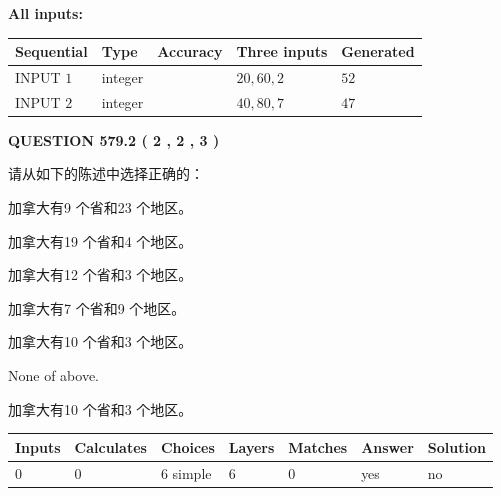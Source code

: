 \documentclass{ctexart}
\begin{document}
   
   
   
\noindent\vspace{0.1in}\hspace{-0.08in} {\textbf{\Large{All inputs: }}}
   
   
  
  
\noindent\begin{tabular}{|l|l|l|l|l|}
\hline
 Sequential & Type & Accuracy & Three inputs & Generated \\ 
\hline
 
 
  INPUT $  1 $ & integer &  & $
 20
 , 
 60
 , 
 2
 $ & $ 52 $ 
 \\  \hline  
 
 
  INPUT $  2 $ & integer &  & $
 40
 , 
 80
 , 
 7
 $ & $ 47 $ 
 \\  \hline  
 \end{tabular}
   
   
  
\vspace{0.2in}
  
{\textbf{\Large{QUESTION
579.2 
 ( 2 , 2 , 3 )
}}}
  
  
请从如下的陈述中选择正确的：
 
 
加拿大有9 个省和23 个地区。
 
 
加拿大有19 个省和4 个地区。
 
 
加拿大有12 个省和3 个地区。
 
 
加拿大有7 个省和9 个地区。
 
 
加拿大有10 个省和3 个地区。
 
 
 None of above.
 
 
\noindent{}
 
 
加拿大有10 个省和3 个地区。
 
 
\noindent{}
 
 
   
   
   
   
\noindent\begin{tabular}{|l|l|l|l|l|l|l|}
 \hline
Inputs & Calculates & Choices & Layers & Matches & Answer & Solution \\ \hline
 0  & 
 0  & 
 6
  simple  
  & 
 6  & 
 0  & 
  yes & 
  no 
  \\ \hline
 \end{tabular}
   
\end{document}
